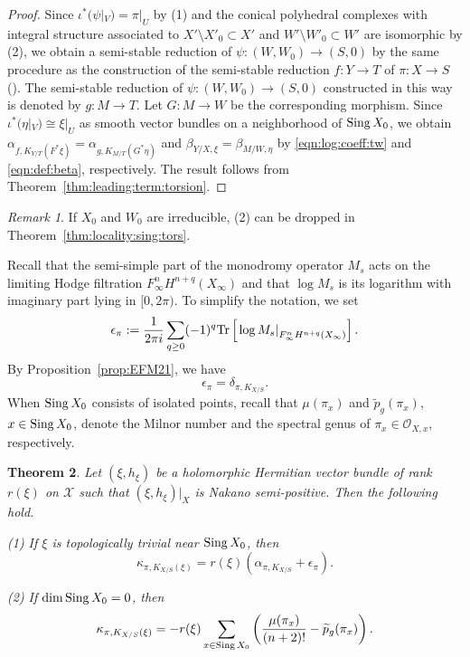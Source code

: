 \documentclass[amscd, leqno]{amsart}
\theoremstyle{plain}
\newtheorem{theorem}{Theorem}[section]
\theoremstyle{definition}
\theoremstyle{remark}
\newtheorem{remark}[theorem]{Remark}
\newenvironment{pf}{\begin{proof}}{\end{proof}}
\begin{document}
\begin{pf}
Since $\iota^{*}(\psi|_{V}) = \pi|_{U}$ by (1) and the conical polyhedral complexes with integral structure associated to 
$X'\setminus X'_{0} \subset X'$ and $W'\setminus W'_{0} \subset W'$ are isomorphic by (2), 
we obtain a semi-stable reduction of $\psi \colon (W, W_{0}) \to (S,0)$ by the same procedure 
as the construction of the semi-stable reduction $f \colon Y \to T$ of $\pi \colon X \to S$ (\cite[Chap.\,II Sect.\,3]{Mumford73}). 
The semi-stable reduction of $\psi \colon (W, W_{0}) \to (S,0)$ constructed in this way is denoted by $g \colon M \to T$. 
Let $G \colon M \to W$ be the corresponding morphism.
Since $\iota^{*}(\eta|_{V}) \cong \xi|_{U}$ as smooth vector bundles on a neighborhood of ${\rm Sing}\,X_{0}$, 
we obtain $\alpha_{f, K_{Y/T}(F^{*}\xi)} = \alpha_{g, K_{M/T}(G^{*}\eta)}$ and $\beta_{Y/X, \xi} = \beta_{M/W, \eta}$ by 
\eqref{eqn:log:coeff:tw} and \eqref{eqn:def:beta}, respectively. The result follows from Theorem~\ref{thm:leading:term:torsion}.
\end{pf}


\begin{remark}
If $X_{0}$ and $W_{0}$ are irreducible, (2) can be dropped in Theorem~\ref{thm:locality:sing:tors}. 
\end{remark}


Recall that the semi-simple part of the monodromy operator $M_{s}$ acts on the limiting Hodge filtration $F^{n}_{\infty}H^{n+q}(X_{\infty})$ 
and that $\log M_{s}$ is its logarithm with imaginary part lying in $[0, 2\pi)$. To simplify the notation, we set
\begin{equation}
\label{eqn:lg:monodromy}
\epsilon_{\pi} := \frac{1}{2\pi i} \sum_{q\geq 0} (-1)^{q} {\rm Tr} \left[ \left. \log M_{s} \right|_{F^{n}_{\infty}H^{n+q}(X_{\infty})} \right].
\end{equation}
By Proposition~\ref{prop:EFM21}, we have
\begin{equation}
\label{eqn:}
\epsilon_{\pi} = \delta_{\pi, K_{X/S}}.
\end{equation}
When ${\rm Sing}\,X_{0}$ consists of isolated points, recall that $\mu(\pi_{x})$ and $\widetilde{p}_{g}(\pi_{x})$, $x \in {\rm Sing}\,X_{0}$,
denote the Milnor number and the spectral genus of $\pi_{x} \in {\mathcal O}_{X,x}$, respectively. 


\begin{theorem}
\label{thm:sing:tors:N:pos}
Let $(\xi, h_{\xi})$ be a holomorphic Hermitian vector bundle of rank $r(\xi)$ on ${\mathcal X}$ such that 
$(\xi, h_{\xi})|_{X}$ is Nakano semi-positive. Then the following hold.
\par{\rm (1)}
If $\xi$ is topologically trivial near ${\rm Sing}\,X_{0}$, then 
$$
\kappa_{\pi, K_{X/S}(\xi)} = r(\xi)( \alpha_{\pi, K_{X/S}} + \epsilon_{\pi} ).
$$
\par{\rm (2)}
If $\dim {\rm Sing}\,X_{0} = 0$, then 
$$
\kappa_{\pi, K_{X/S}(\xi)} = -r(\xi) \sum_{x\in {\rm Sing}\,X_{0}} \left( \frac{\mu(\pi_{x})}{(n+2)!} - \widetilde{p}_{g}(\pi_{x}) \right).
$$
\end{theorem}
\end{document}

